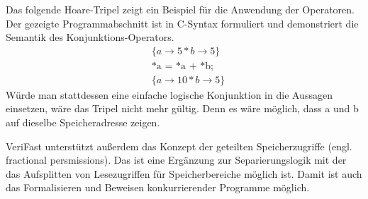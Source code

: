 Das folgende Hoare-Tripel zeigt ein Beispiel für die Anwendung der Operatoren. Der gezeigte Programmabschnitt ist in C-Syntax
formuliert und demonstriert die Semantik des Konjunktions-Operators.
\begin{align*}
& \{a \to 5 \ast b \to 5 \} \\
& \text{*a = *a + *b;} \\
& \{a \to 10 \ast b \to 5\}
\end{align*}
Würde man stattdessen eine einfache logische Konjunktion in die Aussagen einsetzen, wäre das Tripel nicht mehr 
gültig. Denn es wäre möglich, dass a und b auf dieselbe Speicheradresse zeigen.

VeriFast unterstützt außerdem das Konzept der geteilten Speicherzugriffe (engl. fractional persmissions). Das
ist eine Ergänzung zur Separierungslogik mit der das Aufsplitten von Lesezugriffen für Speicherbereiche möglich ist\cite{concurrent}.
Damit ist auch das Formalisieren und Beweisen konkurrierender Programme möglich.  

